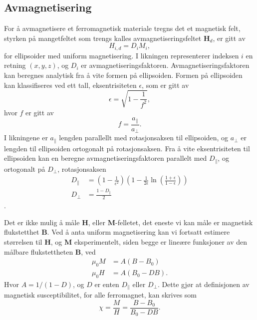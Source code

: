 \documentclass[%
 reprint,
 amsmath,amssymb,
 aps,
]{revtex4-1}
\begin{document}
\subsection{Avmagnetisering}
For å avmagnetisere et ferromagnetisk materiale tregns det et magnetisk felt, styrken på mangetfeltet som trengs kalles avmagnetiseringsfeltet $\bm{H}_d$, er gitt av
\begin{equation}
  H_{i, d} = D_iM_i,
\end{equation}
for ellipsoider med uniform magnetisering. I likningen representerer indeksen $i$ en retning $(x, y, z)$, og $D_i$ er avmagnetiseringsfaktoren. Avmagnetiseringsfaktoren kan beregnes analytisk fra å vite formen på ellipsoiden. Formen på ellipsoiden kan klassifiseres ved ett tall, eksentrisiteten $\epsilon$, som er gitt av
\begin{equation}
  \epsilon = \sqrt{1-\frac{1}{f^2}},\label{eksent}
\end{equation}
hvor $f$ er gitt av
\begin{equation}
  f = \frac{a_{\parallel}}{a_{\perp}}.
\end{equation}
I likningene er $a_{\parallel}$ lengden parallellt med rotasjonsaksen til ellipsoiden, og $a_{\perp}$ er lengden til ellipsoiden ortogonalt på rotasjonsaksen. Fra å vite eksentrisiteten til ellipsoiden kan en beregne avmagnetiseringsfaktoren parallelt med $D_{\parallel}$, og ortogonalt på $D_{\perp}$, rotasjonsaksen
\begin{align}
  D_{\parallel} &= \left(1-\frac{1}{\epsilon^2}\right)\left(1-\frac{1}{2\epsilon}\ln{\left(\frac{1+\epsilon}{1-\epsilon}\right)} \right) \\
  D_{\perp} &= \frac{1-D_{\parallel}}{2}
\end{align}.
\par
Det er ikke mulig å måle $\bm{H}$, eller $\bm{M}$-felletet, det eneste vi kan måle er magnetisk flukstetthet $\bm{B}$. Ved å anta uniform magnetisering kan vi fortsatt estimere størrelsen til $\bm{H}$, og $\bm{M}$ eksperimentelt, siden begge er lineære funksjoner av den målbare flukstettheten $\bm{B}$, ved
\begin{align}
  \mu_0 M &= A\left(B-B_0\right) \\
  \mu_0 H &= A\left(B_0 - DB\right).
\end{align}
Hvor $A=1/(1-D)$, og $D$ er enten $D_{\parallel}$ eller $D_{\perp}$. Dette gjør at definisjonen av magnetisk susceptibilitet, for alle ferromagnet, kan skrives som
\begin{equation}
  \chi = \frac{M}{H} = \frac{B-B_0}{B_0-DB}.
\end{equation}
\end{document}
